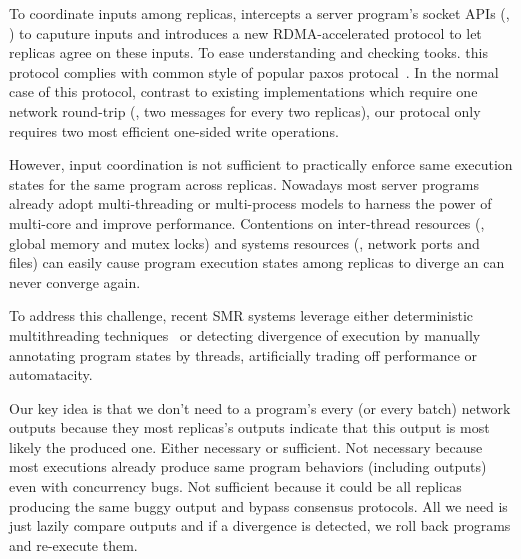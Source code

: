 
To coordinate inputs among replicas, \xxx intercepts a server program's socket 
APIs (\eg, \recv) to caputure inputs and introduces a new RDMA-accelerated 
\paxos protocol to let replicas agree on these inputs. To ease understanding 
and checking tooks. this protocol complies with common style of popular paxos 
protocal~\cite{paxos:practical}. In the normal case of this protocol, contrast 
to existing implementations which require one network round-trip (\ie, two 
messages for every two replicas), our protocal only requires two most efficient 
one-sided write operations.


However, input coordination is not sufficient to practically enforce same 
execution states for the same program across replicas. Nowadays most server 
programs already adopt multi-threading or multi-process models to harness the 
power of multi-core and improve performance. Contentions on inter-thread 
resources (\eg, global memory and \pthread mutex locks) and systems resources 
(\eg, network ports and files) can easily cause program execution states among 
replicas to diverge an can never converge again. 

To address this challenge, recent SMR systems leverage either deterministic 
multithreading techniques~\cite{rex:eurosys14,crane:sosp15} or detecting 
divergence of execution by manually annotating program states by threads, 
artificially trading off performance or automatacity.


Our key idea is that we don't need to a program's every (or every batch) 
network outputs because they most replicas's outputs indicate that this output 
is most likely the produced one. Either necessary or sufficient. Not necessary 
because most executions already produce same program behaviors (including 
outputs) even with concurrency bugs. Not sufficient because it could be all 
replicas producing the same buggy output and bypass consensus protocols. All we 
need is just lazily compare outputs and if a divergence is detected, we roll 
back programs and re-execute them.

